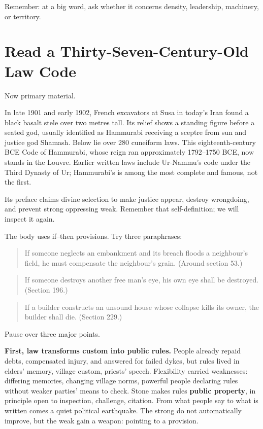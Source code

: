 Remember: at a big word, ask whether it concerns density, leadership, machinery, or territory.

\section[Read an Ancient Law Code]{Read a Thirty-Seven-Century-Old Law Code}
Now primary material.

In late 1901 and early 1902, French excavators at Susa in today's Iran found a black basalt stele over two metres tall. Its relief shows a standing figure before a seated god, usually identified as Hammurabi receiving a sceptre from sun and justice god Shamash. Below lie over 280 cuneiform laws. This eighteenth-century BCE Code of Hammurabi, whose reign ran approximately 1792--1750 BCE, now stands in the Louvre. Earlier written laws include Ur-Nammu's code under the Third Dynasty of Ur; Hammurabi's is among the most complete and famous, not the first.

Its preface claims divine selection to make justice appear, destroy wrongdoing, and prevent strong oppressing weak. Remember that self-definition; we will inspect it again.

The body uses if--then provisions. Try three paraphrases:

\begin{quote}
If someone neglects an embankment and its breach floods a neighbour's field, he must compensate the neighbour's grain. (Around section 53.)
\end{quote}
\begin{quote}
If someone destroys another free man's eye, his own eye shall be destroyed. (Section 196.)
\end{quote}
\begin{quote}
If a builder constructs an unsound house whose collapse kills its owner, the builder shall die. (Section 229.)
\end{quote}
Pause over three major points.

\textbf{First, law transforms custom into public rules.} People already repaid debts, compensated injury, and answered for failed dykes, but rules lived in elders' memory, village custom, priests' speech. Flexibility carried weaknesses: differing memories, changing village norms, powerful people declaring rules without weaker parties' means to check. Stone makes rules \textbf{public property}, in principle open to inspection, challenge, citation. From what people say to what is written comes a quiet political earthquake. The strong do not automatically improve, but the weak gain a weapon: pointing to a provision.


